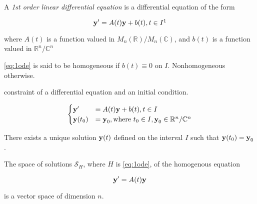 	\begin{definition}
		A \textit{1st order linear differential equation} is a differential equation of the form

		\begin{equation} \label{eq:1ode}
			\bv{y}' = A(t) \bv{y} + b(t), t \in I\footnotemark
		\end{equation}

		where $A(t)$ is a function valued in $M_n(\mathbb{R}) / M_n(\mathbb{C})$, and $b(t)$ is a function valued in $\mathbb{R}^n / \mathbb{C}^n$

		\cref*{eq:1ode} is said to be homogeneous if $b(t) \equiv 0$ on $I$. Nonhomogeneous otherwise.
	\end{definition}

	\begin{definition}
		constraint of a differential equation and an initial condition.

		\begin{equation} \label{eq:ivp}
			\begin{cases}
				\bm{\mathrm{y}}' &= A(t) \bm{\mathrm{y}} + b(t), t \in I\\
				\bm{\mathrm{y}}(t_0) &= \bm{\mathrm{y}}_0, \text{where } t_0 \in I, \bm{\mathrm{y}}_0 \in \mathbb{R}^n / \mathbb{C}^n
			\end{cases}
		\end{equation}
	\end{definition}

	\begin{theorem}
		\label{theo:cauchy-lip}
		There exists a unique solution $\bm{\mathrm{y}}(t)$ defined on the interval $I$ such that $\bm{\mathrm{y}}(t_0) = \bm{\mathrm{y}}_0$.
	\end{theorem}

	\begin{corollary}
		The space of solutions $\mathcal{S}_H$, where $H$ is \cref*{eq:1ode}, of the homogenous equation 
		
		\[\bm{\mathrm{y}}' = A(t) \bm{\mathrm{y}}\]
		
		is a vector space of dimension $n$.
	\end{corollary}

